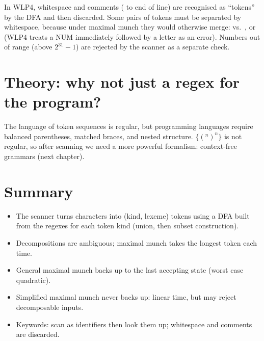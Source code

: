 In WLP4, whitespace and comments (\code{//} to end of line) are recognised as ``tokens''
by the DFA and then discarded. Some pairs of tokens must be separated by whitespace,
because under maximal munch they would otherwise merge:  vs.\ , or
 (WLP4 treats a NUM immediately followed by a letter as an error). Numbers out of
range (above $2^{31}-1$) are rejected by the scanner as a separate check.

\section{Theory: why not just a regex for the program?}

The language of token sequences is regular, but programming languages require balanced
parentheses, matched braces, and nested structure. $\{(^n )^n\}$ is not regular, so after
scanning we need a more powerful formalism: context-free grammars (next chapter).

\section{Summary}
\begin{itemize}
  \item The scanner turns characters into (kind, lexeme) tokens using a DFA built from the
        regexes for each token kind (union, then subset construction).
  \item Decompositions are ambiguous; maximal munch takes the longest token each time.
  \item General maximal munch backs up to the last accepting state (worst case quadratic).
  \item Simplified maximal munch never backs up: linear time, but may reject decomposable inputs.
  \item Keywords: scan as identifiers then look them up; whitespace and comments are discarded.
\end{itemize}
